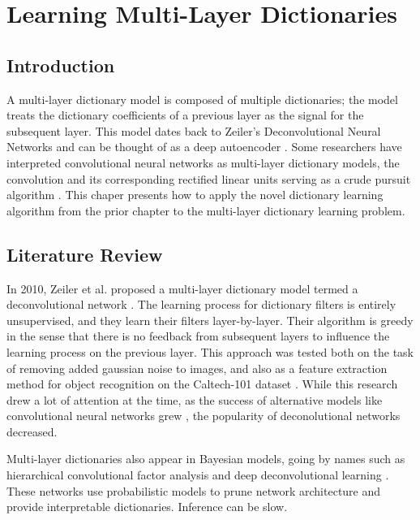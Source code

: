 \chapter{Learning Multi-Layer Dictionaries}
\section{Introduction}
A multi-layer dictionary model is composed of multiple dictionaries; the model treats the dictionary coefficients of a previous layer as the signal for the subsequent layer. This model dates back to Zeiler's Deconvolutional Neural Networks \cite{zeiler2010deconvolutional} and can be thought of as a deep autoencoder \cite[Chapter~14]{Goodfellow2016-DeepLearningBook}\cite{Rangamani2018DictLandAE}. Some researchers have interpreted convolutional neural networks as multi-layer dictionary models, the convolution and its corresponding rectified linear units serving as a crude pursuit algorithm \cite{papyan2017convolutional}. This chaper presents how to apply the novel dictionary learning algorithm from the prior chapter to the multi-layer dictionary learning problem.
\section{Literature Review}
In 2010, Zeiler et al. proposed a multi-layer dictionary model termed a deconvolutional network \cite{zeiler2010deconvolutional}. The learning process for dictionary filters is entirely unsupervised, and they learn their filters layer-by-layer. Their algorithm is greedy in the sense that there is no feedback from subsequent layers to influence the learning process on the previous layer. This approach was tested both on the task of removing added gaussian noise to images, and also as a feature extraction method for object recognition on the Caltech-101 dataset \cite{fei2004-Caltech101}. While this research drew a lot of attention at the time, as the success of alternative models like convolutional neural networks grew \cite{krizhevsky2012imagenet}, the popularity of deconolutional networks decreased.

Multi-layer dictionaries also appear in Bayesian models, going by names such as hierarchical convolutional factor analysis \cite{chen2011hierarchical}\cite{chen2013deep} and deep deconvolutional learning \cite{pu2014generative}. These networks use probabilistic models to prune network architecture and provide interpretable dictionaries. Inference can be slow.

